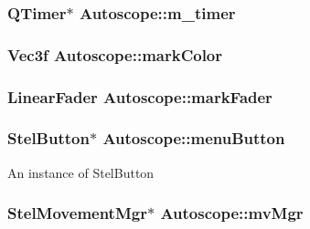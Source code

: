 \subsubsection[{\texorpdfstring{m\+\_\+timer}{m_timer}}]{\setlength{\rightskip}{0pt plus 5cm}Q\+Timer$\ast$ Autoscope\+::m\+\_\+timer\hspace{0.3cm}{\ttfamily [private]}}\hypertarget{class_autoscope_a6d86ef1f5ea17f5175009a15004b2459}{}\label{class_autoscope_a6d86ef1f5ea17f5175009a15004b2459}
\subsubsection[{\texorpdfstring{mark\+Color}{markColor}}]{\setlength{\rightskip}{0pt plus 5cm}Vec3f Autoscope\+::mark\+Color\hspace{0.3cm}{\ttfamily [private]}}\hypertarget{class_autoscope_a58327daadc555f31fc62b6db85e3fcfa}{}\label{class_autoscope_a58327daadc555f31fc62b6db85e3fcfa}
\subsubsection[{\texorpdfstring{mark\+Fader}{markFader}}]{\setlength{\rightskip}{0pt plus 5cm}Linear\+Fader Autoscope\+::mark\+Fader\hspace{0.3cm}{\ttfamily [private]}}\hypertarget{class_autoscope_a9c141894e06ed64f4131f1071e9e18af}{}\label{class_autoscope_a9c141894e06ed64f4131f1071e9e18af}
\subsubsection[{\texorpdfstring{menu\+Button}{menuButton}}]{\setlength{\rightskip}{0pt plus 5cm}Stel\+Button$\ast$ Autoscope\+::menu\+Button\hspace{0.3cm}{\ttfamily [private]}}\hypertarget{class_autoscope_a5b14962697fbd8fffac986df08aee611}{}\label{class_autoscope_a5b14962697fbd8fffac986df08aee611}
An instance of Stel\+Button 
\subsubsection[{\texorpdfstring{mv\+Mgr}{mvMgr}}]{\setlength{\rightskip}{0pt plus 5cm}Stel\+Movement\+Mgr$\ast$ Autoscope\+::mv\+Mgr}\hypertarget{class_autoscope_ab34124a1179a937ac061bb4fa3faa2de}{}\label{class_autoscope_ab34124a1179a937ac061bb4fa3faa2de}


